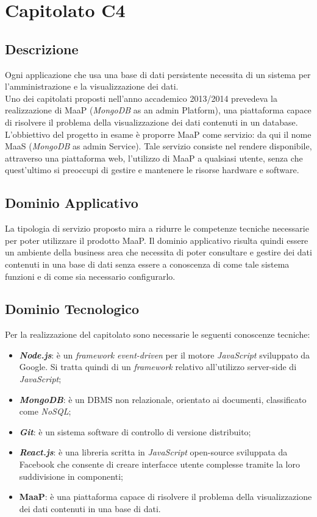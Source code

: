 \newpage
\section{Capitolato C4}
\subsection{Descrizione}
Ogni applicazione che usa una base di dati persistente necessita di un sistema per l'amministrazione e la visualizzazione dei dati.\\ Uno dei capitolati proposti nell'anno accademico 2013/2014 prevedeva la realizzazione di MaaP (\textit{MongoDB} as an admin Platform), una piattaforma capace di risolvere il problema della visualizzazione dei dati contenuti in un database.\\
L'obbiettivo del progetto in esame è proporre MaaP come servizio: da qui il nome MaaS (\textit{MongoDB} as admin Service). Tale servizio consiste nel rendere disponibile, attraverso una piattaforma web, l'utilizzo di MaaP a qualsiasi utente, senza che quest'ultimo si preoccupi di gestire e mantenere le risorse hardware e software.

\subsection{Dominio Applicativo}
La tipologia di servizio proposto mira a ridurre le competenze tecniche necessarie per poter utilizzare il prodotto MaaP. Il dominio applicativo risulta quindi essere un ambiente della business area che necessita di poter consultare e gestire dei dati contenuti in una base di dati senza essere a conoscenza di come tale sistema funzioni e di come sia necessario configurarlo.

\subsection{Dominio Tecnologico}
Per la realizzazione del capitolato sono necessarie le seguenti conoscenze tecniche:
\begin{itemize}
	\item \textbf{\textit{Node.js}}: è un \textit{framework} \textit{event-driven} per il motore \textit{JavaScript} sviluppato da Google. Si tratta quindi di un \textit{framework} relativo all'utilizzo server-side di \textit{JavaScript};
	\item \textbf{\textit{MongoDB}}: è un DBMS non relazionale, orientato ai documenti, classificato come \textit{NoSQL};
	\item \textbf{\textit{Git}}: è un sistema software di controllo di versione distribuito;
	\item \textbf{\textit{React.js}}: è una libreria scritta in \textit{JavaScript} open-source sviluppata da Facebook che consente di creare interfacce utente complesse tramite la loro suddivisione in componenti;
	\item \textbf{MaaP}: è una piattaforma capace di risolvere il problema della visualizzazione dei dati contenuti in una base di dati.
\end{itemize}

